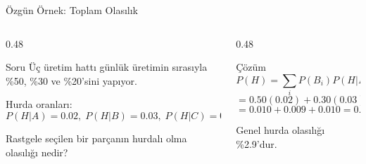 \documentclass[light]{lutbeamer}
\begin{document}
\begin{frame}{Özgün Örnek: Toplam Olasılık}
\small
\begin{columns}[T,onlytextwidth]
    \begin{column}{0.48\textwidth}
        \begin{block}{Soru}
            Üç üretim hattı günlük üretimin sırasıyla \%50, \%30 ve \%20'sini yapıyor.

            Hurda oranları:
            \[
            P(H|A)=0.02,\; P(H|B)=0.03,\; P(H|C)=0.05
            \]

            Rastgele seçilen bir parçanın hurdalı olma olasılığı nedir?
        \end{block}
    \end{column}
    \begin{column}{0.48\textwidth}
        \begin{exampleblock}{Çözüm}
            \[
            P(H)=\sum_i P(B_i)P(H|B_i)
            \]
            \[
            =0.50(0.02)+0.30(0.03)+0.20(0.05)
            \]
            \[
            =0.010+0.009+0.010=0.029
            \]

            Genel hurda olasılığı \%2.9'dur.
        \end{exampleblock}
    \end{column}
\end{columns}
\end{frame}
\end{document}
